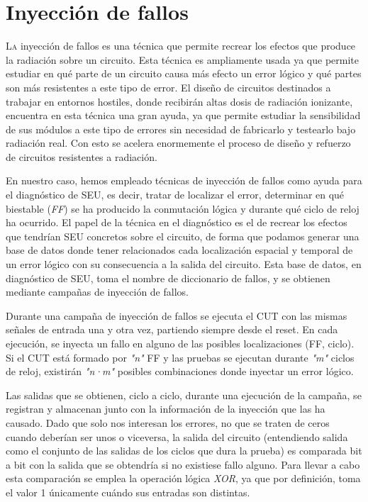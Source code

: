 \chapter{Inyección de fallos}
\label{ch:InyeccionDeFallos}

\lettrine[lraise=-0.1, lines=2, loversize=0.2]{L}{a} inyección de fallos es una
técnica que permite recrear los efectos que produce la radiación sobre un
circuito. Esta técnica es ampliamente usada ya que permite estudiar en qué parte
de un circuito causa más efecto un error lógico y qué partes son más resistentes a
este tipo de error. El diseño de circuitos destinados a trabajar en entornos 
hostiles, donde recibirán altas dosis de radiación ionizante, encuentra en esta
técnica una gran ayuda, ya que permite estudiar la sensibilidad de sus módulos a
este tipo de errores sin necesidad de fabricarlo y testearlo bajo radiación real.
Con esto se acelera enormemente el proceso de diseño y refuerzo de circuitos
resistentes a radiación.

En nuestro caso, hemos empleado técnicas de inyección de fallos como ayuda para el
diagnóstico de \gls{SEU}, es decir, tratar de localizar el error, determinar en 
qué biestable (\textit{\gls{FF}}) se ha producido la conmutación lógica y durante
qué ciclo de reloj ha ocurrido. El papel de la técnica en el diagnóstico es el de
recrear los efectos que tendrían \gls{SEU} concretos sobre el circuito, de forma
que podamos generar una base de datos donde tener relacionados cada localización
espacial y temporal de un error lógico con su consecuencia a la salida del
circuito. Esta base de datos, en diagnóstico de \gls{SEU}, toma el nombre de
diccionario de fallos, y se obtienen mediante campañas de inyección de fallos.

Durante una campaña de inyección de fallos se ejecuta el \gls{CUT} con las mismas
señales de entrada una y otra vez, partiendo siempre desde el reset. En cada
ejecución, se inyecta un fallo en alguno de las posibles localizaciones (\gls{FF}, 
ciclo). Si el \gls{CUT} está formado por \textit{"n"} \gls{FF} y las pruebas se 
ejecutan durante \textit{"m"} ciclos de reloj, existirán \textit{"n·m"} posibles 
combinaciones donde inyectar un error lógico.


Las salidas que se obtienen, ciclo a ciclo, durante una ejecución de la campaña, 
se registran y almacenan junto con la información de la inyección que las ha 
causado. Dado que solo nos interesan los errores, no que se traten de ceros cuando
deberían ser unos o viceversa, la salida del circuito (entendiendo salida como el
conjunto de las salidas de los ciclos que dura la prueba) es comparada bit a bit
con la salida que se obtendría si no existiese fallo alguno. Para llevar a cabo
esta comparación se emplea la operación lógica \textit{XOR}, ya que por
definición, toma el valor 1 únicamente cuándo sus entradas son distintas.

